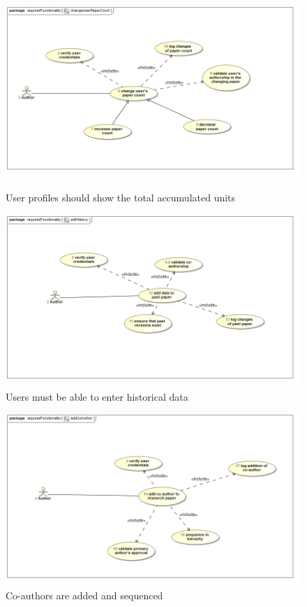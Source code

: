 \documentclass[a4paper,12pt]{report}
\begin{document}
\begin{figure}[ht]
\includegraphics[scale=0.5]{uc__changeUserPaperCount.jpg} 
\caption{User profiles should show the total accumulated units}


\includegraphics[scale=0.5]{uc__editHistory.jpg} 
\caption{Users must be able to enter historical data}

\end{figure}
\newpage
\begin{figure}[ht]
\includegraphics[scale=0.5]{uc__addCoAuthor.jpg} 
\caption{Co-authors are added and sequenced}


\end{figure}
\end{document}

